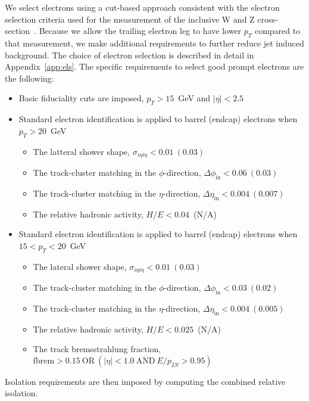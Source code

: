 We select electrons using a cut-based approach consistent with the electron 
selection criteria used for the measurement of the inclusive W and Z 
cross-section~\cite{VBTFCrossSectionNote}. 
Because we allow the trailing electron leg to have lower $p_T$ compared
to that measurement, we make additional requirements to further reduce
jet induced background.
The choice of electron selection is described in detail in Appendix~\ref{app:els}.
The specific requirements to select good prompt electrons are the following:

\begin{itemize}
    \item Basic fiduciality cuts are imposed,  $p_T>15$~GeV and $|\eta| < 2.5$
    \item Standard electron identification is applied to barrel (endcap) electrons when $p_T>20$~GeV
    \begin{itemize}
        \item The latteral shower shape, $\sigma_{i\eta i\eta} < 0.01~(0.03)$
        \item The track-cluster matching in the $\phi$-direction, $\Delta \phi_{\mathrm{in}} < 0.06~(0.03)$
        \item The track-cluster matching in the $\eta$-direction, $\Delta \eta_{\mathrm{in}} < 0.004~(0.007)$
        \item The relative hadronic activity, $H/E<0.04$~(N/A)
    \end{itemize}
    \item Standard electron identification is applied to barrel (endcap) electrons when $15<p_T<20$~GeV
    \begin{itemize}
        \item The lateral shower shape, $\sigma_{i\eta i\eta} < 0.01~(0.03)$
        \item The track-cluster matching in the $\phi$-direction, $\Delta \phi_{\mathrm{in}} < 0.03~(0.02)$
        \item The track-cluster matching in the $\eta$-direction, $\Delta \eta_{\mathrm{in}} < 0.004~(0.005)$
        \item The relative hadronic activity, $H/E<0.025$~(N/A)
        \item The track bremsstrahlung fraction, $\mathrm{fbrem}>0.15~\mathrm{OR}~(|\eta|<1.0~\mathrm{AND}~E/p_{IN}>0.95)$
    \end{itemize}
\end{itemize}

Isolation requirements are then imposed by computing the combined relative isolation.

